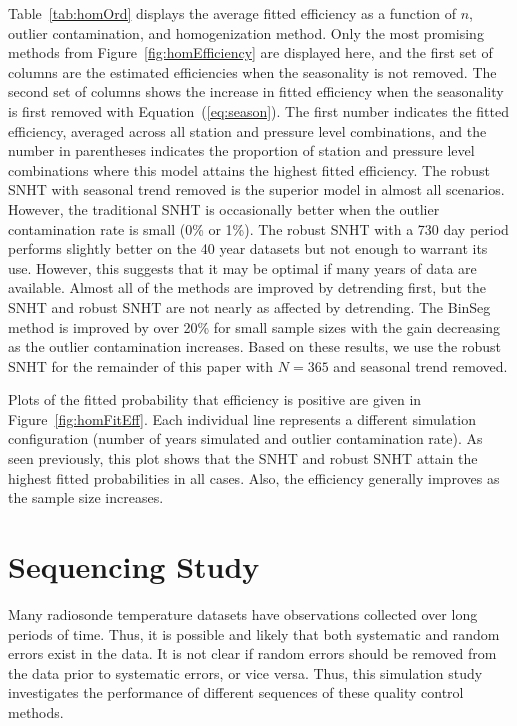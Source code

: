 \documentclass[12pt]{article}
\begin{document}
\begin{doublespacing}
Table~\ref{tab:homOrd} displays the average fitted efficiency as a function of $n$, outlier contamination, and homogenization method.  Only the most promising methods from  Figure~\ref{fig:homEfficiency} are displayed here, and the first set of columns are the estimated efficiencies when the seasonality is not removed.  The second set of columns shows the increase in fitted efficiency when the seasonality is first removed with Equation~(\ref{eq:season}).   The first number indicates the fitted efficiency, averaged across all station and pressure level combinations, and the number in parentheses indicates the proportion of station and pressure level combinations where this model attains the highest fitted efficiency.  The robust SNHT with seasonal trend removed is the superior model in almost all scenarios.  However, the traditional SNHT is occasionally better when the outlier contamination rate is small (0\% or 1\%).  The robust SNHT with a 730 day period performs slightly better on the 40 year datasets but not enough to warrant its use.  However, this suggests that it may be optimal if many years of data are available. Almost all of the methods are improved by detrending first, but the SNHT and robust SNHT are not nearly as affected by detrending.  The BinSeg method  is improved by over 20\% for small sample sizes with the gain decreasing as the outlier contamination increases.  Based on these results, we use the robust SNHT for the remainder of this paper with $N=365$ and seasonal trend removed.

Plots of the fitted probability that efficiency is positive are given in Figure~\ref{fig:homFitEff}.  Each individual line represents a different simulation configuration (number of years simulated and outlier contamination rate).  As seen previously, this plot shows that the SNHT and robust SNHT attain the highest fitted probabilities in all cases.  Also, the efficiency generally improves as the sample size increases.

\section{Sequencing Study}

Many radiosonde temperature datasets have observations collected over long periods of time.  Thus, it is possible and likely that both systematic and random errors exist in the data.  It is not clear if random errors should be removed from the data prior to systematic errors, or vice versa.  Thus, this simulation study investigates the performance of different sequences of these quality control methods.


\end{doublespacing}
\end{document}
